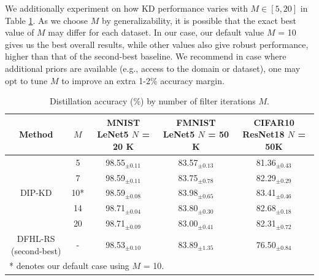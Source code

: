 \begin{foldable}
    We additionally experiment on how KD performance varies with $M \in [5, 20]$ in Table \ref{tab:abla-num_filter_iterations}. As we choose $M$ by generalizability, it is possible that the exact best value of $M$ may differ for each dataset. In our case, our default value $M$ = 10 gives us the best overall results, while other values also give robust performance, higher than that of the second-best baseline. We recommend in case where additional priors are available (e.g., access to the domain or dataset), one may opt to tune $M$ to improve an extra 1-2\% accuracy margin.
\end{foldable}

\begin{table}[h]
    \caption{Distillation accuracy (\%) by number of filter iterations $M$.}
    \label{tab:abla-num_filter_iterations}
    \centering
    \begin{tabular}{c|c|c|c|c}
        \hline
            \textbf{Method}
            & $M$
            & \makecell{\textbf{MNIST}   \\ LeNet5  \\ $N$ = 20 K}
            & \makecell{\textbf{FMNIST}  \\ LeNet5  \\ $N$ = 50 K}
            & \makecell{\textbf{CIFAR10} \\ ResNet18 \\ $N$ = 50K} \\
        \hline
        \multirow{5}{*}{DIP-KD} & \phantom{0}5   & 98.55$_{\pm 0.11}$ & 83.57$_{\pm 0.13}$ & 81.36$_{\pm 0.43}$ \\
                                & \phantom{0}7   & 98.59$_{\pm 0.11}$ & 83.75$_{\pm 0.78}$ & 82.29$_{\pm 0.29}$ \\
                                & \phantom{*}10* & 98.59$_{\pm 0.08}$ & 83.98$_{\pm 0.65}$ & 83.41$_{\pm 0.46}$ \\
                                & 14             & 98.71$_{\pm 0.04}$ & 83.80$_{\pm 0.30}$ & 82.68$_{\pm 0.18}$ \\
                                & 20             & 98.71$_{\pm 0.09}$ & 83.00$_{\pm 0.41}$ & 82.31$_{\pm 0.72}$ \\
        \hline
        DFHL-RS (second-best)   & -              & 98.53$_{\pm 0.10}$ & 83.89$_{\pm 1.35}$ & 76.50$_{\pm 0.84}$ \\
        \hline
        \multicolumn{4}{l}{* denotes our default case using $M$ = 10.} \\
    \end{tabular}
\end{table}
